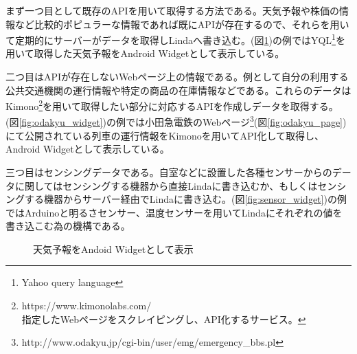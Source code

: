 まず一つ目として既存のAPIを用いて取得する方法である。天気予報や株価の情報など比較的ポピュラーな情報であれば既にAPIが存在するので、それらを用いて定期的にサーバーがデータを取得しLindaへ書き込む。(図\ref{fig:weather_widget})の例ではYQL\footnote{Yahoo query language}を用いて取得した天気予報をAndroid Widgetとして表示している。

二つ目はAPIが存在しないWebページ上の情報である。例として自分の利用する公共交通機関の運行情報や特定の商品の在庫情報などである。これらのデータはKimono\footnote{https://www.kimonolabs.com/\\指定したWebページをスクレイピングし、API化するサービス。}を用いて取得したい部分に対応するAPIを作成しデータを取得する。(図\ref{fig:odakyu_widget})の例では小田急電鉄のWebページ\footnote{http://www.odakyu.jp/cgi-bin/user/emg/emergency\_bbs.pl}(図\ref{fig:odakyu_page})にて公開されている列車の運行情報をKimonoを用いてAPI化して取得し、Android Widgetとして表示している。

三つ目はセンシングデータである。自室などに設置した各種センサーからのデータに関してはセンシングする機器から直接Lindaに書き込むか、もしくはセンシングする機器からサーバー経由でLindaに書き込む。(図\ref{fig:sensor_widget})の例ではArduinoと明るさセンサー、温度センサーを用いてLindaにそれぞれの値を書き込こむ為の機構である。

\begin{figure}[htbp]
  \begin{minipage}{\hsize}
    \begin{center}
    \end{center}
    \caption{天気予報をAndoid Widgetとして表示}
    \label{fig:weather_widget}
  \end{minipage}
\end{figure}

